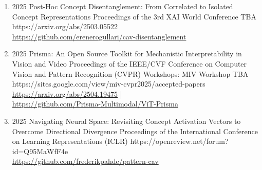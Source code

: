 {\begin{enumerate}
        \item {}
                        {2025}
                        {Post-Hoc Concept Disentanglement: From Correlated to Isolated Concept Representations}
                        {Proceedings of the 3rd XAI World Conference}
                        {TBA}
                        {https://arxiv.org/abs/2503.05522}
                        {
                            \\\href{https://github.com/erenerogullari/cav-disentanglement}{https://github.com/erenerogullari/cav-disentanglement}
                        }
                        
        \item {}
                        {2025}
                        {Prisma: An Open Source Toolkit for Mechanistic Interpretability in Vision and Video}
                        {Proceedings of the IEEE/CVF Conference on Computer Vision and Pattern Recognition (CVPR) Workshops: MIV Workshop}
                        {TBA}
                        {https://sites.google.com/view/miv-cvpr2025/accepted-papers}
                        {
                            \\\href{https://arxiv.org/abs/2504.19475}{https://arxiv.org/abs/2504.19475} | 
                            \\\href{https://github.com/Prisma-Multimodal/ViT-Prisma}{https://github.com/Prisma-Multimodal/ViT-Prisma}
                        }
        
        \item {}
                        {2025}
                        {Navigating Neural Space: Revisiting Concept Activation Vectors to Overcome Directional Divergence}
                        {Proceedings of the International Conference on Learning Representations (ICLR)}
                        {}
                        {https://openreview.net/forum?id=Q95MaWfF4e}
                        {\\ \href{https://github.com/frederikpahde/pattern-cav}{https://github.com/frederikpahde/pattern-cav}}
        
        
        

\end{enumerate}}
